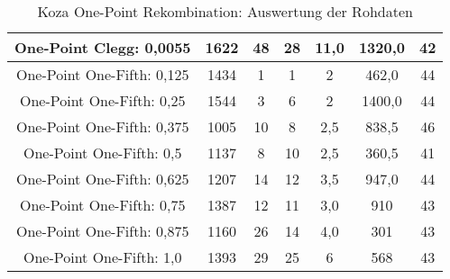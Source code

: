 \begin{table}[H]
\begin{tabular}{c | c | c | c | c | c | c}
		\hline
		One-Point Clegg: 0,0055 & 1622 & 48 & 28 & 11,0 & 1320,0 & 42\\
		\hline
		One-Point One-Fifth: 0,125 & 1434 & 1 & 1 & 2 & 462,0 & 44\\
		\hline
		One-Point One-Fifth: 0,25 & 1544 & 3 & 6 & 2 & 1400,0 & 44\\
		\hline
		One-Point One-Fifth: 0,375 & 1005 & 10 & 8 & 2,5 & 838,5 & 46\\
		\hline
		One-Point One-Fifth: 0,5 & 1137 & 8 & 10 & 2,5 & 360,5 & 41\\
		\hline
		One-Point One-Fifth: 0,625 & 1207 & 14 & 12 & 3,5 & 947,0 & 44\\
		\hline
		One-Point One-Fifth: 0,75 & 1387 & 12 & 11 & 3,0 & 910 & 43\\
		\hline
		One-Point One-Fifth: 0,875 & 1160 & 26 & 14 & 4,0 & 301 & 43\\
		\hline
		One-Point One-Fifth: 1,0 & 1393 & 29 & 25 & 6 & 568 & 43\\
	\end{tabular}
	\caption{Koza One-Point Rekombination: Auswertung der Rohdaten}
	\label{table:kozaOnePointRohdaten}
\end{table}

